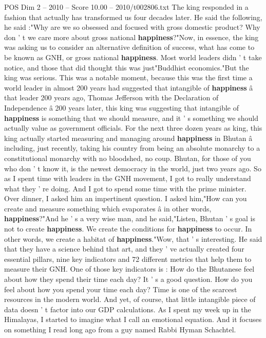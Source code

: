 \begin{textsample}{POS Dim 2 – 2010 – Score 10.00 – 2010/t002806.txt}
The king responded in a fashion that actually has transformed us four decades later.
He said the following, he said :"Why are we so obsessed and focused with gross domestic product?
Why don ' t we care more about gross national \textbf{happiness}?"Now, in essence, the king was asking us to consider an alternative definition of success, what has come to be known as GNH, or gross national \textbf{happiness}.
Most world leaders didn ' t take notice, and those that did thought this was just"Buddhist economics."But the king was serious.
This was a notable moment, because this was the first time a world leader in almost 200 years had suggested that intangible of \textbf{happiness} â that leader 200 years ago, Thomas Jefferson with the Declaration of Independence â 200 years later, this king was suggesting that intangible of \textbf{happiness} is something that we should measure, and it ' s something we should actually value as government officials.
For the next three dozen years as king, this king actually started measuring and managing around \textbf{happiness} in Bhutan â including, just recently, taking his country from being an absolute monarchy to a constitutional monarchy with no bloodshed, no coup.
Bhutan, for those of you who don ' t know it, is the newest democracy in the world, just two years ago.
So as I spent time with leaders in the GNH movement, I got to really understand what they ' re doing.
And I got to spend some time with the prime minister.
Over dinner, I asked him an impertinent question.
I asked him,"How can you create and measure something which evaporates â in other words, \textbf{happiness}?"And he ' s a very wise man, and he said,"Listen, Bhutan ' s goal is not to create \textbf{happiness}.
We create the conditions for \textbf{happiness} to occur.
In other words, we create a habitat of \textbf{happiness}."Wow, that ' s interesting.
He said that they have a science behind that art, and they ' ve actually created four essential pillars, nine key indicators and 72 different metrics that help them to measure their GNH.
One of those key indicators is : How do the Bhutanese feel about how they spend their time each day?
It ' s a good question.
How do you feel about how you spend your time each day?
Time is one of the scarcest resources in the modern world.
And yet, of course, that little intangible piece of data doesn ' t factor into our GDP calculations.
As I spent my week up in the Himalayas, I started to imagine what I call an emotional equation.
And it focuses on something I read long ago from a guy named Rabbi Hyman Schachtel.

\end{textsample}
